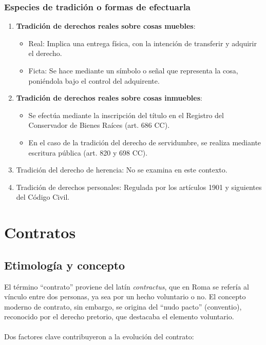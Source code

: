 \documentclass{templateNote}
\begin{document}
\subsubsection{Especies de tradición o formas de efectuarla}
\begin{enumerate}
    \item \textbf{Tradición de derechos reales sobre cosas muebles}:
    \begin{itemize}
        \item Real: Implica una entrega física, con la intención de transferir y adquirir el derecho.
        \item Ficta: Se hace mediante un símbolo o señal que representa la cosa, poniéndola bajo el control del adquirente.
    \end{itemize}
    \item \textbf{Tradición de derechos reales sobre cosas inmuebles}:
    \begin{itemize}
        \item Se efectúa mediante la inscripción del título en el Registro del Conservador de Bienes Raíces (art. 686 CC).
        \item En el caso de la tradición del derecho de servidumbre, se realiza mediante escritura pública (art. 820 y 698 CC).
    \end{itemize}
    \item Tradición del derecho de herencia: No se examina en este contexto.
    \item Tradición de derechos personales: Regulada por los artículos 1901 y siguientes del Código Civil.
\end{enumerate} 

\newpage
\section{Contratos}
\subsection{Etimología y concepto}

El término ``contrato'' proviene del latín \textit{contractus}, que en Roma se refería al vínculo entre dos personas, ya sea por un hecho voluntario o no. El concepto moderno de contrato, sin embargo, se origina del ``nudo pacto'' (conventio), reconocido por el derecho pretorio, que destacaba el elemento voluntario.
\\\\
Dos factores clave contribuyeron a la evolución del contrato:
\end{document}
